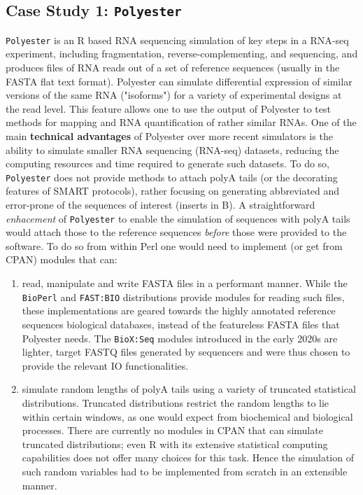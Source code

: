 \documentclass[10pt]{article}
\begin{document}
\subsection{Case Study 1: \texttt{Polyester}}
\texttt{Polyester}\cite{frazee_polyester_2015} is an R based RNA sequencing simulation of key steps in a RNA-seq experiment, including fragmentation, reverse-complementing, and sequencing, and produces files of RNA reads out of a set of reference sequences (usually in the FASTA flat text format). Polyester can simulate differential expression of similar versions of the same RNA ("isoforms") for a variety of experimental designs at the read level. This feature allows one to use the output of Polyester to test methods for mapping and RNA quantification of rather similar RNAs. One of the main \textbf{technical advantages} of Polyester over more recent simulators is the ability to simulate smaller RNA sequencing (RNA-seq) datasets, reducing the computing resources and time required to generate such datasets. To do so, \texttt{Polyester} does not provide methods to attach polyA tails (or the decorating features of SMART protocols), rather focusing on generating abbreviated and error-prone of the sequences of interest (inserts in B). A straightforward \textit{enhacement} of \texttt{Polyester} to enable the simulation of sequences with polyA tails would attach those to the reference sequences \textit{before} those were provided to the software. To do so from within Perl one would need to implement (or get from CPAN) modules that can:
\begin{enumerate}
\item read, manipulate and write FASTA files in a performant manner. While the \texttt{BioPerl} and \texttt{FAST:BIO} distributions provide modules for reading such files, these implementations are geared towards the highly annotated reference sequences biological databases, instead of the featureless FASTA files that Polyester needs.  The \texttt{BioX:Seq} modules introduced in the early 2020s are lighter,  target FASTQ files generated by sequencers and were thus chosen to provide the relevant IO functionalities. 
\item simulate random lengths of polyA tails using a variety of truncated statistical distributions. Truncated distributions restrict the random lengths to lie within certain windows, as one would expect from biochemical and biological processes. There are currently no modules in CPAN that can simulate truncated distributions; even R with its extensive statistical computing capabilities does not offer many choices for this task. Hence the simulation of such random variables had to be implemented from scratch in an extensible manner.  
\end{enumerate}
\end{document}
